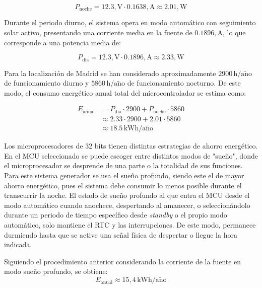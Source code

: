\begin{equation}
P_{\mathrm{noche}} = 12.3,\mathrm{V} \cdot 0.1638,\mathrm{A} \approx 2.01,\mathrm{W}
\end{equation}

Durante el periodo diurno, el sistema opera en modo automático con seguimiento solar activo, presentando una corriente media en la fuente de $0.1896,\mathrm{A}$, lo que corresponde a una potencia media de:

\begin{equation}
P_{\mathrm{dia}} = 12.3,\mathrm{V} \cdot 0.1896,\mathrm{A}	\approx 2.33,\mathrm{W}
\end{equation}

Para la localización de Madrid se han considerado aproximadamente $2900\,\mathrm{h/a\tilde{n}o}$ de funcionamiento diurno y $5860\,\mathrm{h/a\tilde{n}o}$ de funcionamiento nocturno. De este modo, el consumo energético anual total del microcontrolador se estima como:

\begin{equation}
	\begin{split}
		E_{\mathrm{anual}} &=
		P_{\mathrm{d\text{í}a}} \cdot 2900
		+ P_{\mathrm{noche}} \cdot 5860 \\
		&\approx 2.33 \cdot 2900 + 2.01 \cdot 5860 \\
		&\approx 18.5\,\mathrm{kWh/a\tilde{n}o}
	\end{split}
\end{equation}

Los microprocesadores de 32 bits tienen distintas estrategias de ahorro energético. En el MCU seleccionado se puede escoger entre distintos modos de "sueño", donde el microprocesador se desprende de una parte o la totalidad de sus funciones. Para este sistema generador se usa el sueño profundo, siendo este el de mayor ahorro energético, pues el sistema debe consumir lo menos posible durante el transcurrir la noche. El estado de sueño profundo al que entra el MCU desde el modo automático cuando anochece, despertando al amanecer, o seleccionándolo durante un periodo de tiempo específico desde \textit{standby} o el propio modo automático, solo mantiene el RTC y las interrupciones. De este modo, permanece durmiendo  hasta que se active una señal física de despertar o llegue la hora indicada.    

Siguiendo el procedimiento anterior considerando la corriente de la fuente en modo sueño profundo, se obtiene:
\begin{equation}
	E_{\mathrm{anual}} \approx 15,4\,\mathrm{kWh/a\tilde{n}o}
\end{equation}

